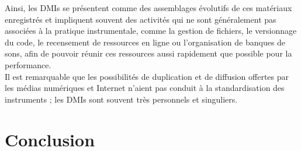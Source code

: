 \indent Ainsi, les \glspl{DMI} se présentent comme des assemblages évolutifs de ces matériaux enregistrés et impliquent souvent des activités qui ne sont généralement pas associées à la pratique instrumentale, comme la gestion de fichiers, le versionnage du code, le recensement de ressources en ligne ou l'organisation de banques de sons, afin de pouvoir réunir ces ressources aussi rapidement que possible pour la performance.\\
\indent Il est remarquable que les possibilités de duplication et de diffusion offertes par les médias numériques et Internet n'aient pas conduit à la standardisation des instruments ; les \glspl{DMI} sont souvent très personnels et singuliers.

\section{Conclusion}

